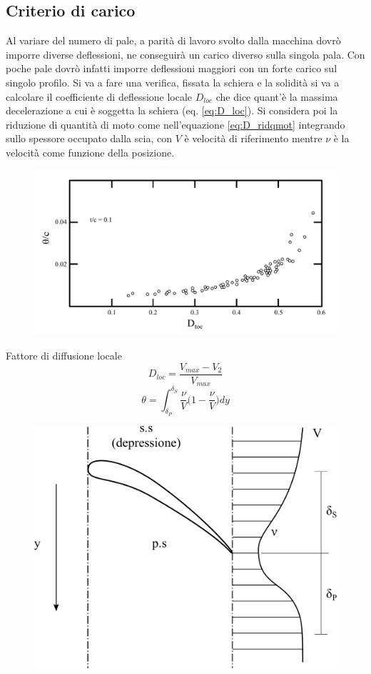 \subsection{Criterio di carico}
Al variare del numero di pale, a parità di lavoro svolto dalla macchina dovrò imporre diverse deflessioni, ne conseguirà un carico diverso sulla singola pala. Con poche pale dovrò infatti imporre deflessioni maggiori con un forte carico sul singolo profilo.
Si va a fare una verifica, fissata la schiera e la solidità si va a calcolare il coefficiente di deflessione locale $D_{loc}$ che dice quant'è la massima decelerazione a cui è soggetta la schiera (eq. \ref{eq:D_loc}). Si considera poi la riduzione di quantità di moto come nell'equazione \ref{eq:D_ridqmot} integrando sullo spessore occupato dalla scia, con $V$ è velocità di riferimento mentre $\nu$ è la velocità come funzione della posizione.
\begin{figure}
\centering
  \includegraphics[width=\textwidth]{fig/CritCarico1.pdf}
\caption{}
\label{fig:CritCarico1}
\end{figure}
Fattore di diffusione locale
\begin{equation}\label{eq:D_loc}
D_{loc} = \frac{V_{max} - V_2}{V_{max}}
\end{equation}
\begin{equation}\label{eq:D_ridqmot}
\theta = \int_{\delta_P}^{\delta_S} \frac{\nu}{V} \bigg(1- \frac{\nu}{V} \bigg) dy
\end{equation} 
\begin{figure}
\centering
  \includegraphics[width=.4\textwidth]{fig/CritCarico2.pdf}
\caption{}
\label{fig:CritCarico2}
\end{figure}
